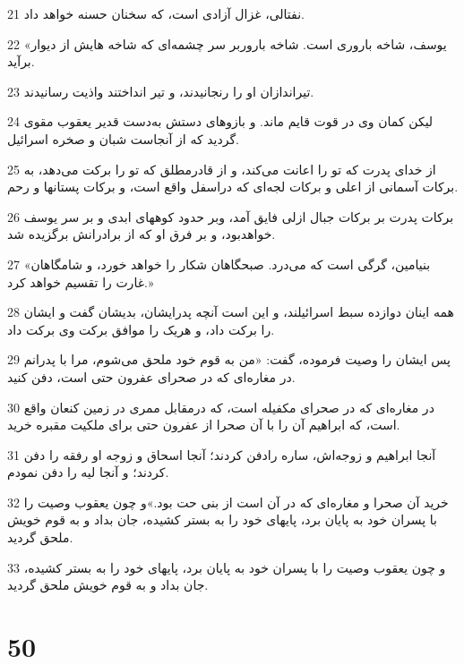 \par 21 نفتالی، غزال آزادی است، که سخنان حسنه خواهد داد.
\par 22 «یوسف، شاخه باروری است. شاخه باروربر سر چشمه‌ای که شاخه هایش از دیوار برآید.
\par 23 تیراندازان او را رنجانیدند، و تیر انداختند واذیت رسانیدند.
\par 24 لیکن کمان وی در قوت قایم ماند. و بازوهای دستش به‌دست قدیر یعقوب مقوی گردید که از آنجاست شبان و صخره اسرائیل.
\par 25 از خدای پدرت که تو را اعانت می‌کند، و از قادرمطلق که تو را برکت می‌دهد، به برکات آسمانی از اعلی و برکات لجه‌ای که دراسفل واقع است، و برکات پستانها و رحم.
\par 26 برکات پدرت بر برکات جبال ازلی فایق آمد، وبر حدود کوههای ابدی و بر سر یوسف خواهدبود، و بر فرق او که از برادرانش برگزیده شد.
\par 27 «بنیامین، گرگی است که می‌درد. صبحگاهان شکار را خواهد خورد، و شامگاهان غارت را تقسیم خواهد کرد.»
\par 28 همه اینان دوازده سبط اسرائیلند، و این است آنچه پدرایشان، بدیشان گفت و ایشان را برکت داد، و هریک را موافق برکت وی برکت داد.
\par 29 پس ایشان را وصیت فرموده، گفت: «من به قوم خود ملحق می‌شوم، مرا با پدرانم در مغاره‌ای که در صحرای عفرون حتی است، دفن کنید.
\par 30 در مغاره‌ای که در صحرای مکفیله است، که درمقابل ممری در زمین کنعان واقع است، که ابراهیم آن را با آن صحرا از عفرون حتی برای ملکیت مقبره خرید.
\par 31 آنجا ابراهیم و زوجه‌اش، ساره رادفن کردند؛ آنجا اسحاق و زوجه او رفقه را دفن کردند؛ و آنجا لیه را دفن نمودم.
\par 32 خرید آن صحرا و مغاره‌ای که در آن است از بنی حت بود.»و چون یعقوب وصیت را با پسران خود به پایان برد، پایهای خود را به بستر کشیده، جان بداد و به قوم خویش ملحق گردید.
\par 33 و چون یعقوب وصیت را با پسران خود به پایان برد، پایهای خود را به بستر کشیده، جان بداد و به قوم خویش ملحق گردید.
 
\chapter{50}

